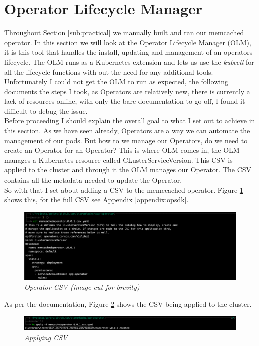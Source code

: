 \section{Operator Lifecycle Manager}
\label{sub:olm}
Throughout Section \ref{sub:practical} we manually built and ran our memcached operator. In this section we will look at the Operator Lifecycle Manager (OLM), it is this tool that handles the install, updating and management of an operators lifecycle. The OLM runs as a Kubernetes extension and lets us use the \textit{kubectl} for all the lifecycle functions with out the need for any additional tools.
\\Unfortunately I could not get the OLM to run as expected, the following documents the steps I took, as Operators are relatively new, there is currently a lack of resources online, with only the bare documentation to go off, I found it difficult to debug the issue.
\\Before proceeding I should explain the overall goal to what I set out to achieve in this section. As we have seen already, Operators are a way we can automate the management of our pods. But how to we manage our Operators, do we need to create an Operator for an Operator? This is where OLM comes in, the OLM manages a Kubernetes resource called CLusterServiceVersion. This CSV is applied to the cluster and through it the OLM manages our Operator. The CSV contains all the metadata needed to update the Operator.
\\So with that I set about adding a CSV to the memecached operator. Figure \ref{img:olm1} shows this, for the full CSV see Appendix \ref{appendix:opsdk}.

\begin{figure}[!ht]
\centering
\includegraphics*[width=1\textwidth]{images/olm1.png}
\caption{\em Operator CSV (image cut for brevity)}
\label{img:olm1}
\end{figure}

As per the documentation, Figure \ref{img:olm2} shows the CSV being applied to the cluster.
\begin{figure}[!ht]
\centering
\includegraphics*[width=1\textwidth]{images/olm2.png}
\caption{\em Applying CSV}
\label{img:olm2}
\end{figure}

